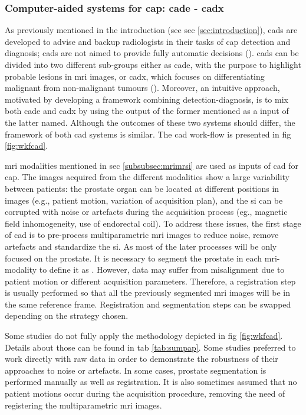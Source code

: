 \subsubsection{Computer-aided systems for \ac{cap}: \ac{cade} - \ac{cadx}} \label{subsubsec:CAD}

As previously mentioned in the introduction (see \acs{sec} \ref{sec:introduction}), \acp{cad} are developed to advise and backup radiologists in their tasks of \ac{cap} detection and diagnosis; \acp{cad} are not aimed to provide fully automatic decisions (\cite{Giger2008}). \acp{cad} can be divided into two different sub-groups either as \ac{cade}, with the purpose to highlight probable lesions in \ac{mri} images, or \ac{cadx}, which focuses on differentiating malignant from non-malignant tumours (\cite{Giger2008}). Moreover, an intuitive approach, motivated by developing a framework combining detection-diagnosis, is to mix both \ac{cade} and \ac{cadx} by using the output of the former mentioned as a input of the latter named. Although the outcomes of these two systems should differ, the framework of both \ac{cad} systems is similar. The \ac{cad} work-flow is presented in \acs{fig} \ref{fig:wkfcad}.

\ac{mri} modalities mentioned in \acs{sec} \ref{subsubsec:mrimrsi} are used as inputs of \ac{cad} for \ac{cap}. %
The images acquired from the different modalities show a large variability between patients: the prostate organ can be located at different positions in images (e.g., patient motion, variation of acquisition plan), and the \ac{si} can be corrupted with noise or artefacts during the acquisition process (eg., magnetic field inhomogeneity, use of endorectal coil). To address these issues, the first stage of \ac{cad} is to pre-process multiparametric \ac{mri} images to reduce noise, remove artefacts and standardize the \ac{si}. As most of the later processes will be only focused on the prostate. It is necessary to segment the prostate in each \ac{mri}-modality to define it as . However, data may suffer from misalignment due to patient motion or different acquisition parameters. Therefore, a registration step is usually performed so that all the previously segmented \ac{mri} images will be in the same reference frame. Registration and segmentation steps can be swapped depending on the strategy chosen.

Some studies do not fully apply the methodology depicted in \acs{fig} \ref{fig:wkfcad}. Details about those can be found in \acs{tab} \ref{tab:sumpap}. Some studies preferred to work directly with raw data in order to demonstrate the robustness of their approaches to noise or artefacts. In some cases, prostate segmentation is performed manually as well as registration. It is also sometimes assumed that no patient motions occur during the acquisition procedure, removing the need of registering the multiparametric \ac{mri} images.

